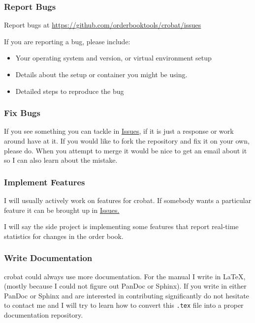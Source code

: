 \documentclass[refman]{article}
\begin{document}
\subsubsection{Report Bugs}
Report bugs at \href{https://github.com/orderbooktools/crobat/issues}{https://github.com/orderbooktools/crobat/issues}
 
 If you are reporting a bug, please include:
 \begin{itemize}
 	\item Your operating system and version, or virtual environment setup
 	\item Details about the setup or container you might be using.
 	\item Detailed steps to reproduce the bug
 \end{itemize}
 
 \subsubsection{Fix Bugs}
 
 If you see something you can tackle in \href{https://github.com/orderbooktools/crobat/issues}{Issues}, if it is just a response or work around have at it. If you would like to fork the repository and fix it on your own, please do. When you attempt to merge it would be nice to get an email about it so I can also learn about the mistake. 
 
 \subsubsection{Implement Features}
 
 I will usually actively work on features for crobat. If somebody wants a particular feature it can be brought up in \href{https://github.com/orderbooktools/crobat/issues}{Issues.}
 \smallskip
 
 \noindent I will say the side project is implementing some features that report real-time statistics for changes in the order book.
 
 \subsubsection{Write Documentation}
 
 crobat could always use more documentation. For the manual I write in \LaTeX, (mostly because  I could not figure out PanDoc or Sphinx). If you write in either PanDoc or Sphinx and are interested in contributing significantly do not hesitate to contact me and I will try to learn how to convert this \texttt{.tex} file into a proper documentation repository.
 
\end{document}
